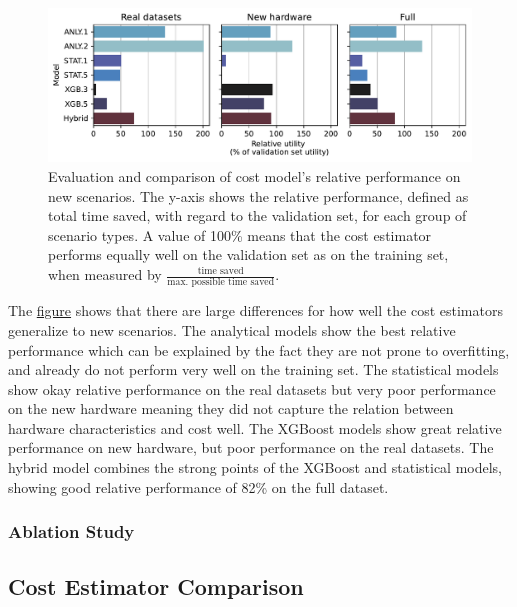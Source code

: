 \begin{figure}
    \centering
    \includegraphics[width=\linewidth]{chapters/06_evaluation/figures/eval_generalization.pdf}
    \caption[Evaluation of performance on new scenarios]{Evaluation and comparison of cost model's relative performance on new scenarios. The y-axis shows the relative performance, defined as total time saved, with regard to the validation set, for each group of scenario types. A value of 100\% means that the cost estimator performs equally well on the validation set as on the training set, when measured by $\frac{\text{time saved}}{\text{max. possible time saved}}$.}
    \label{fig:6-generalization}
\end{figure}

The \hyperref[fig:6-generalization]{figure} shows that there are large differences for how well the cost estimators generalize to new scenarios. The analytical models show the best relative performance which can be explained by the fact they are not prone to overfitting, and already do not perform very well on the training set. The statistical models show okay relative performance on the real datasets but very poor performance on the new hardware meaning they did not capture the relation between hardware characteristics and cost well. The XGBoost models show great relative performance on new hardware, but poor performance on the real datasets. The hybrid model combines the strong points of the XGBoost and statistical models, showing good relative performance of 82\% on the full dataset.

\subsubsection{Ablation Study}
\label{subsubsec:6-ablation}

\subsection{Cost Estimator Comparison}
\label{subsec:6-sota-comparison}

